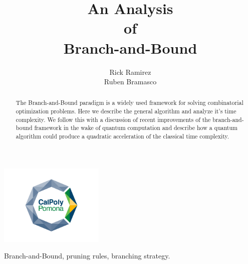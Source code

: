 \documentclass[]{IEEEphot}
\begin{document}
	
	\title{An Analysis\\ of \\ Branch-and-Bound}
	
	\author{Rick Ramirez\\ Ruben Bramasco}
	
	\maketitle
	\vspace{-2cm}
	\begin{center}
    	\includegraphics[width=5cm]{primary-logo-inside-stacked}\\
    \end{center}
	\vspace{0.25cm}

	\begin{receivedinfo}%

	\end{receivedinfo}
	
	\begin{abstract}
		\doublespacing\small
		The Branch-and-Bound paradigm is a widely used framework for solving combinatorial optimization problems.
		Here we describe the general algorithm and analyze it's time complexity.
		We follow this with a discussion of recent improvements of the branch-and-bound framework in the wake of quantum computation and describe how a quantum algorithm could produce a quadratic acceleration of the classical time complexity.
	\end{abstract}

	\begin{IEEEkeywords}
		Branch-and-Bound, pruning rules, branching strategy.
	\end{IEEEkeywords}


	
	
	
	
	
	
	
	
	

	
	
	
	
	
\end{document}
